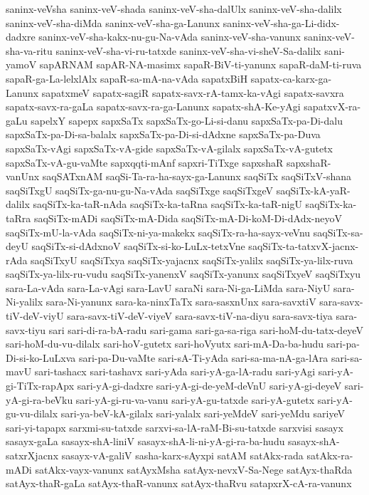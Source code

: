 {saninx-veVsha
saninx-veV-shada
saninx-veV-sha-dalUlx
saninx-veV-sha-dalilx
saninx-veV-sha-diMda
saninx-veV-sha-ga-Lanunx
saninx-veV-sha-ga-Li-didx-dadxre
saninx-veV-sha-kakx-nu-gu-Na-vAda
saninx-veV-sha-vanunx
saninx-veV-sha-va-ritu
saninx-veV-sha-vi-ru-tatxde
saninx-veV-sha-vi-sheV-Sa-dalilx
sani-yamoV
sapARNAM
sapAR-NA-masimx
sapaR-BiV-ti-yanunx
sapaR-daM-ti-ruva
sapaR-ga-La-lelxlAlx
sapaR-sa-mA-na-vAda
sapatxBiH
sapatx-ca-karx-ga-Lanunx
sapatxmeV
sapatx-sagiR
sapatx-savx-rA-tamx-ka-vAgi
sapatx-savxra
sapatx-savx-ra-gaLa
sapatx-savx-ra-ga-Lanunx
sapatx-shA-Ke-yAgi
sapatxvX-ra-gaLu
sapelxY
sapepx
sapxSaTx
sapxSaTx-go-Li-si-danu
sapxSaTx-pa-Di-dalu
sapxSaTx-pa-Di-sa-balalx
sapxSaTx-pa-Di-si-dAdxne
sapxSaTx-pa-Duva
sapxSaTx-vAgi
sapxSaTx-vA-gide
sapxSaTx-vA-gilalx
sapxSaTx-vA-gutetx
sapxSaTx-vA-gu-vaMte
sapxqqti-mAnf
sapxri-TiTxge
sapxshaR
sapxshaR-vanUnx
saqSATxnAM
saqSi-Ta-ra-ha-sayx-ga-Lanunx
saqSiTx
saqSiTxV-shana
saqSiTxgU
saqSiTx-ga-nu-gu-Na-vAda
saqSiTxge
saqSiTxgeV
saqSiTx-kA-yaR-dalilx
saqSiTx-ka-taR-nAda
saqSiTx-ka-taRna
saqSiTx-ka-taR-nigU
saqSiTx-ka-taRra
saqSiTx-mADi
saqSiTx-mA-Dida
saqSiTx-mA-Di-koM-Di-dAdx-neyoV
saqSiTx-mU-la-vAda
saqSiTx-ni-ya-makekx
saqSiTx-ra-ha-sayx-veVnu
saqSiTx-sa-deyU
saqSiTx-si-dAdxnoV
saqSiTx-si-ko-LuLx-tetxVne
saqSiTx-ta-tatxvX-jacnx-rAda
saqSiTxyU
saqSiTxya
saqSiTx-yajacnx
saqSiTx-yalilx
saqSiTx-ya-lilx-ruva
saqSiTx-ya-lilx-ru-vudu
saqSiTx-yanenxV
saqSiTx-yanunx
saqSiTxyeV
saqSiTxyu
sara-La-vAda
sara-La-vAgi
sara-LavU
saraNi
sara-Ni-ga-LiMda
sara-NiyU
sara-Ni-yalilx
sara-Ni-yanunx
sara-ka-ninxTaTx
sara-sasxnUnx
sara-savxtiV
sara-savx-tiV-deV-viyU
sara-savx-tiV-deV-viyeV
sara-savx-tiV-na-diyu
sara-savx-tiya
sara-savx-tiyu
sari
sari-di-ra-bA-radu
sari-gama
sari-ga-sa-riga
sari-hoM-du-tatx-deyeV
sari-hoM-du-vu-dilalx
sari-hoV-gutetx
sari-hoVyutx
sari-mA-Da-ba-hudu
sari-pa-Di-si-ko-LuLxva
sari-pa-Du-vaMte
sari-sA-Ti-yAda
sari-sa-ma-nA-ga-lAra
sari-sa-mavU
sari-tashacx
sari-tashavx
sari-yAda
sari-yA-ga-lA-radu
sari-yAgi
sari-yA-gi-TiTx-rapApx
sari-yA-gi-dadxre
sari-yA-gi-de-yeM-deVnU
sari-yA-gi-deyeV
sari-yA-gi-ra-beVku
sari-yA-gi-ru-va-vanu
sari-yA-gu-tatxde
sari-yA-gutetx
sari-yA-gu-vu-dilalx
sari-ya-beV-kA-gilalx
sari-yalalx
sari-yeMdeV
sari-yeMdu
sariyeV
sari-yi-tapapx
sarxmi-su-tatxde
sarxvi-sa-lA-raM-Bi-su-tatxde
sarxvisi
sasayx
sasayx-gaLa
sasayx-shA-liniV
sasayx-shA-li-ni-yA-gi-ra-ba-hudu
sasayx-shA-satxrXjacnx
sasayx-vA-galiV
sasha-karx-sAyxpi
satAM
satAkx-rada
satAkx-ra-mADi
satAkx-vayx-vanunx
satAyxMsha
satAyx-nevxV-Sa-Nege
satAyx-thaRda
satAyx-thaR-gaLa
satAyx-thaR-vanunx
satAyx-thaRvu
satapxrX-cA-ra-vanunx
}
